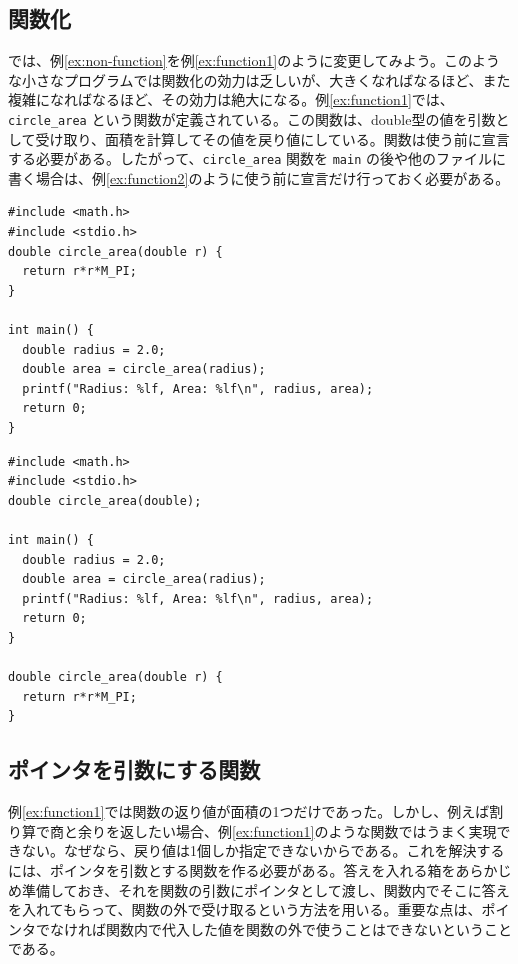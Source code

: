 \subsection{関数化}
では、例\ref{ex:non-function}を例\ref{ex:function1}のように変更してみよう。このような小さなプログラムでは関数化の効力は乏しいが、大きくなればなるほど、また複雑になればなるほど、その効力は絶大になる。例\ref{ex:function1}では、\verb|circle_area| という関数が定義されている。この関数は、double型の値を引数として受け取り、面積を計算してその値を戻り値にしている。関数は使う前に宣言する必要がある。したがって、\verb|circle_area| 関数を \verb|main| の後や他のファイルに書く場合は、例\ref{ex:function2}のように使う前に宣言だけ行っておく必要がある。
%
\begin{reidai}\label{ex:function1}
\begin{verbatim}
#include <math.h>
#include <stdio.h>
double circle_area(double r) {
  return r*r*M_PI;
}

int main() {
  double radius = 2.0;
  double area = circle_area(radius);
  printf("Radius: %lf, Area: %lf\n", radius, area);
  return 0;
}
\end{verbatim}
\end{reidai}
%
\begin{reidai}\label{ex:function2}
\begin{verbatim}
#include <math.h>
#include <stdio.h>
double circle_area(double);

int main() {
  double radius = 2.0;
  double area = circle_area(radius);
  printf("Radius: %lf, Area: %lf\n", radius, area);
  return 0;
} 

double circle_area(double r) {
  return r*r*M_PI;
}
\end{verbatim}
\end{reidai}
%

\subsection{ポインタを引数にする関数}
例\ref{ex:function1}では関数の返り値が面積の1つだけであった。しかし、例えば割り算で商と余りを返したい場合、例\ref{ex:function1}のような関数ではうまく実現できない。なぜなら、戻り値は1個しか指定できないからである。これを解決するには、ポインタを引数とする関数を作る必要がある。答えを入れる箱をあらかじめ準備しておき、それを関数の引数にポインタとして渡し、関数内でそこに答えを入れてもらって、関数の外で受け取るという方法を用いる。重要な点は、ポインタでなければ関数内で代入した値を関数の外で使うことはできないということである。

